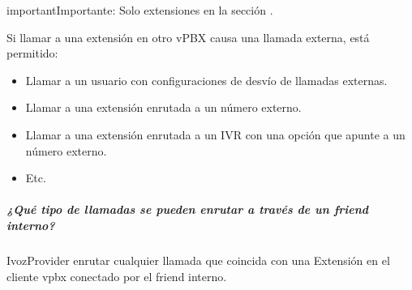 \documentclass[letterpaper,10pt,spanish]{sphinxmanual}
\begin{document}
\begin{notice}{important}{Importante:}
Solo extensiones en la sección {\hyperref[administration_portal/client/vpbx/extensions:extensions]{}}.
\end{notice}

Si llamar a una extensión en otro vPBX causa una llamada externa, está permitido:
\begin{itemize}
\item {} 
Llamar a un usuario con configuraciones de desvío de llamadas externas.

\item {} 
Llamar a una extensión enrutada a un número externo.

\item {} 
Llamar a una extensión enrutada a un IVR con una opción que apunte a un número externo.

\item {} 
Etc.

\end{itemize}


\subparagraph{¿Qué tipo de llamadas se pueden enrutar a través de un \emph{friend interno}?}
\label{administration_portal/client/vpbx/routing_endpoints/friends/internal_friends:what-kind-of-calls-can-be-routed-through-an-internal-friend}
IvozProvider enrutar cualquier llamada que coincida con una Extensión en el cliente vpbx conectado por el friend interno.
\end{document}
